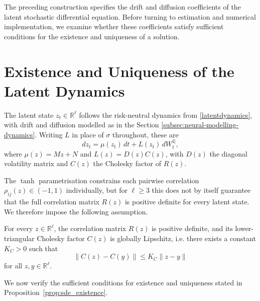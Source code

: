 The preceding construction specifies the drift and diffusion coefficients of the latent stochastic differential equation. Before turning to estimation and numerical implementation, we examine whether these coefficients satisfy sufficient conditions for the existence and uniqueness of a solution.

\section{Existence and Uniqueness of the Latent Dynamics}
\label{sec:baseline_existence_uniqueness}

The latent state $z_t\in\mathbb{R}^\ell$ follows the risk-neutral dynamics from \eqref{latentdynamics}, with drift and diffusion modelled as in the Section \ref{subsec:neural-modelling-dynamics}. Writing $L$ in place of $\sigma$ throughout, these are
\begin{equation}
    dz_t = \mu(z_t)\,dt + L(z_t)\,dW_t^{\mathbb{Q}},
    \label{eq:app_baseline_sde}
\end{equation}
where $\mu(z) = Mz + N$ and $L(z) = D(z)C(z)$, with \(D(z)\) the diagonal volatility matrix and \(C(z)\) the Cholesky factor of \(R(z)\).

The $\tanh$ parametrisation constrains each pairwise correlation $\rho_{ij}(z)\in(-1,1)$ individually, but for $\ell\geq3$ this does not by itself guarantee that the full correlation matrix $R(z)$ is positive definite for every latent state. We therefore impose the following assumption.

\begin{assumption}
\label{ass:baseline_cholesky}
For every $z\in\mathbb{R}^\ell$, the correlation matrix $R(z)$ is positive 
definite, and its lower-triangular Cholesky factor \(C(z)\) is globally Lipschitz, i.e. there exists a constant $K_C>0$ such that
\[
\|C(z)-C(y)\|\leq K_C\|z-y\|
\]
for all $z,y\in\mathbb{R}^\ell$.
\end{assumption}

We now verify the sufficient conditions for existence and uniqueness stated in Proposition~\ref{prop:sde_existence}.

